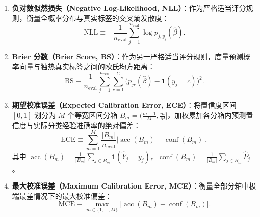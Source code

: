 \begin{enumerate}
\item \textbf{负对数似然损失（Negative Log-Likelihood, NLL）}：作为严格适当评分规则，衡量全概率分布与真实标签的交叉熵发散度：
\begin{equation}\label{eq:nll_eval}
\mathrm{NLL} \equiv - \frac{1}{n_{\mathrm{eval}}} \sum_{j=1}^{n_{\mathrm{eval}}} \log p_{j, y_j}(\hat\beta).
\end{equation}
\item \textbf{Brier 分数（Brier Score, BS）}：作为另一严格适当评分规则，度量预测概率向量与独热真实标签之间的欧氏均方距离：
\begin{equation}\label{eq:brier_eval}
\mathrm{BS} \equiv \frac{1}{n_{\mathrm{eval}}} \sum_{j=1}^{n_{\mathrm{eval}}} \sum_{c=1}^C \Big( p_{jc}(\hat\beta) - \mathbf{1}(y_j = c) \Big)^2.
\end{equation}
\item \textbf{期望校准误差（Expected Calibration Error, ECE）}：将置信度区间 $[0, 1]$ 划分为 $M$ 个等宽区间分箱 $B_m = (\frac{m-1}{M}, \frac{m}{M}]$，加权累加各分箱内预测置信度与实际分类经验准确率的绝对偏差：
\begin{equation}\label{eq:ece_eval}
\mathrm{ECE} \equiv \sum_{m=1}^M \frac{|B_m|}{n_{\mathrm{eval}}} \Big| \operatorname{acc}(B_m) - \operatorname{conf}(B_m) \Big|,
\end{equation}
其中 $\operatorname{acc}(B_m) = \frac{1}{|B_m|} \sum_{j \in B_m} \mathbf{1}(\hat Y_j = y_j)$，$\operatorname{conf}(B_m) = \frac{1}{|B_m|} \sum_{j \in B_m} \hat P_j$。
\item \textbf{最大校准误差（Maximum Calibration Error, MCE）}：衡量全部分箱中极端最差情况下的最大校准偏差：
\begin{equation}\label{eq:mce_eval}
\mathrm{MCE} \equiv \max_{m \in \{1, \dots, M\}} \Big| \operatorname{acc}(B_m) - \operatorname{conf}(B_m) \Big|.
\end{equation}
\end{enumerate}

